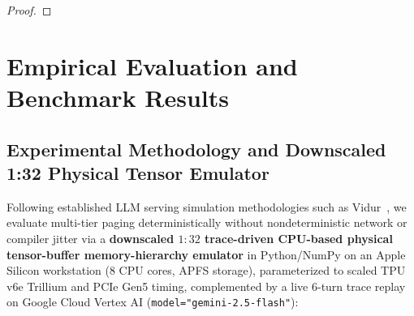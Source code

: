 \documentclass[conference,10pt]{IEEEtran}
\begin{document}
\begin{proof}
\end{proof}

\section{Empirical Evaluation and Benchmark Results}

\subsection{Experimental Methodology and Downscaled 1:32 Physical Tensor Emulator}
Following established LLM serving simulation methodologies such as Vidur~\cite{agrawal2024vidur}, we evaluate multi-tier paging deterministically without nondeterministic network or compiler jitter via a \textbf{downscaled $1:32$ trace-driven CPU-based physical tensor-buffer memory-hierarchy emulator} in Python/NumPy on an Apple Silicon workstation (8 CPU cores, APFS storage), parameterized to scaled TPU v6e Trillium and PCIe Gen5 timing, complemented by a live 6-turn trace replay on Google Cloud Vertex AI (\texttt{model="gemini-2.5-flash"}):
\end{document}
